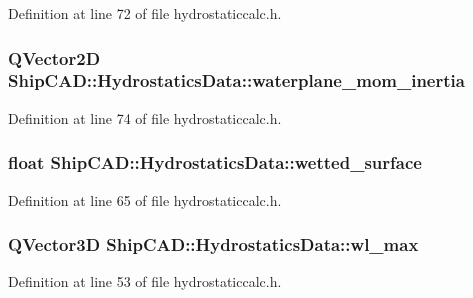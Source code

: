 Definition at line 72 of file hydrostaticcalc.\-h.

\hypertarget{structShipCAD_1_1HydrostaticsData_a2a662521564e9c0160c15acf9d3121f9}{
\subsubsection[{waterplane\-\_\-mom\-\_\-inertia}]{\setlength{\rightskip}{0pt plus 5cm}Q\-Vector2\-D Ship\-C\-A\-D\-::\-Hydrostatics\-Data\-::waterplane\-\_\-mom\-\_\-inertia}}\label{structShipCAD_1_1HydrostaticsData_a2a662521564e9c0160c15acf9d3121f9}


Definition at line 74 of file hydrostaticcalc.\-h.

\hypertarget{structShipCAD_1_1HydrostaticsData_ad4b78176732ea80000adb94b5b5669f3}{
\subsubsection[{wetted\-\_\-surface}]{\setlength{\rightskip}{0pt plus 5cm}float Ship\-C\-A\-D\-::\-Hydrostatics\-Data\-::wetted\-\_\-surface}}\label{structShipCAD_1_1HydrostaticsData_ad4b78176732ea80000adb94b5b5669f3}


Definition at line 65 of file hydrostaticcalc.\-h.

\hypertarget{structShipCAD_1_1HydrostaticsData_a332be807e8373521c238d82b9dcedc38}{
\subsubsection[{wl\-\_\-max}]{\setlength{\rightskip}{0pt plus 5cm}Q\-Vector3\-D Ship\-C\-A\-D\-::\-Hydrostatics\-Data\-::wl\-\_\-max}}\label{structShipCAD_1_1HydrostaticsData_a332be807e8373521c238d82b9dcedc38}


Definition at line 53 of file hydrostaticcalc.\-h.


